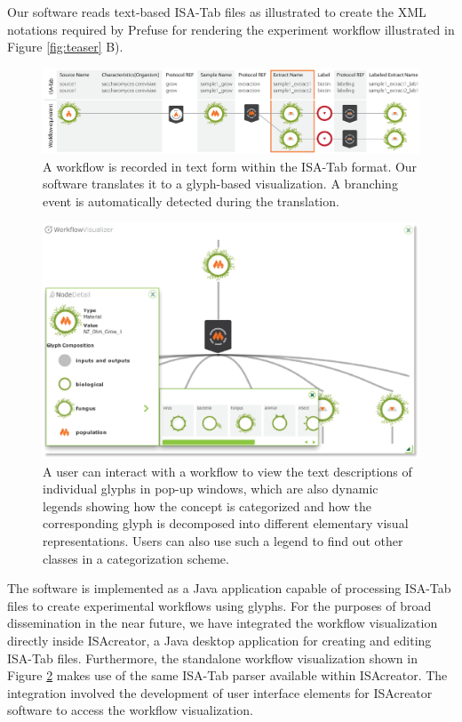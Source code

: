 Our software reads text-based ISA-Tab files as illustrated to create the XML notations required by Prefuse for rendering the experiment workflow illustrated in Figure \ref{fig:teaser} B).

\begin{figure}[t!]
\centering
\includegraphics[width=\textwidth]{images/glyph-taxonomy/generating-workflow-from-text.eps}
\caption{A workflow is recorded in text form within the ISA-Tab format.
Our software translates it to a glyph-based visualization.
A branching event is automatically detected during the translation.}
\label{fig:generating-workflow-from-text}
\end{figure}

\begin{figure}[ht!]
\centering
\includegraphics[width=\textwidth]{images/glyph-taxonomy/bio-workflow-example.eps}
\caption{A user can interact with a workflow to view the text descriptions of individual glyphs in pop-up windows, which are also dynamic legends showing how the concept is categorized and how the corresponding glyph is decomposed into different elementary visual representations. 
Users can also use such a legend to find out other classes in a categorization scheme.}
\label{fig:bioworkflow-example}
\end{figure}

The software is implemented as a Java application capable of processing ISA-Tab files to create experimental workflows using glyphs. 
For the purposes of broad dissemination in the near future, we have integrated the workflow visualization directly inside ISAcreator, a Java desktop application for creating and editing ISA-Tab files. 
Furthermore, the standalone workflow visualization shown in Figure \ref{fig:bioworkflow-example} makes use of the same ISA-Tab parser available within ISAcreator. 
The integration involved the development of user interface elements for ISAcreator software to access the workflow visualization.


